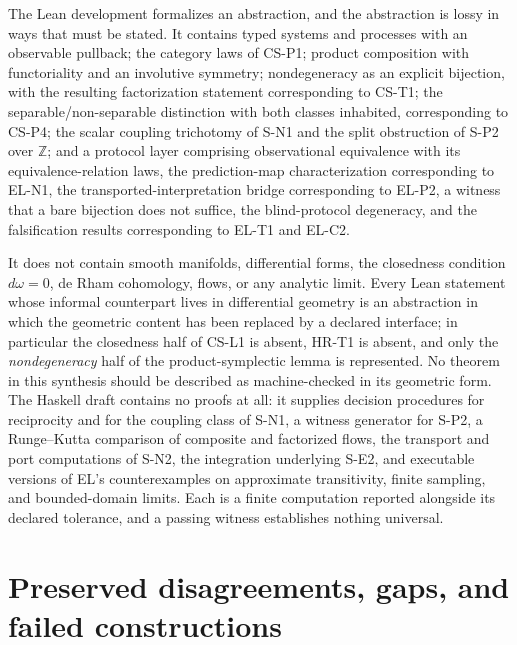 \documentclass[11pt]{article}
\theoremstyle{plain}
\begin{document}
The Lean development formalizes an abstraction, and the abstraction is lossy in
ways that must be stated. It contains typed systems and processes with an
observable pullback; the category laws of CS-P1; product composition with
functoriality and an involutive symmetry; nondegeneracy as an explicit
bijection, with the resulting factorization statement corresponding to CS-T1;
the separable/non-separable distinction with both classes inhabited,
corresponding to CS-P4; the scalar coupling trichotomy of S-N1 and the split
obstruction of S-P2 over $\mathbb{Z}$; and a protocol layer comprising
observational equivalence with its equivalence-relation laws, the prediction-map
characterization corresponding to EL-N1, the transported-interpretation bridge
corresponding to EL-P2, a witness that a bare bijection does not suffice, the
blind-protocol degeneracy, and the falsification results corresponding to EL-T1
and EL-C2.

It does not contain smooth manifolds, differential forms, the closedness
condition $d\omega=0$, de Rham cohomology, flows, or any analytic limit. Every
Lean statement whose informal counterpart lives in differential geometry is an
abstraction in which the geometric content has been replaced by a declared
interface; in particular the closedness half of CS-L1 is absent, HR-T1 is
absent, and only the \emph{nondegeneracy} half of the product-symplectic lemma
is represented. No theorem in this synthesis should be described as
machine-checked in its geometric form. The Haskell draft contains no proofs at
all: it supplies decision procedures for reciprocity and for the coupling class
of S-N1, a witness generator for S-P2, a Runge--Kutta comparison of composite
and factorized flows, the transport and port computations of S-N2, the
integration underlying S-E2, and executable versions of EL's counterexamples on
approximate transitivity, finite sampling, and bounded-domain limits. Each is a
finite computation reported alongside its declared tolerance, and a passing
witness establishes nothing universal.

\section{Preserved disagreements, gaps, and failed constructions}
\label{sec:disagreements}
\end{document}
